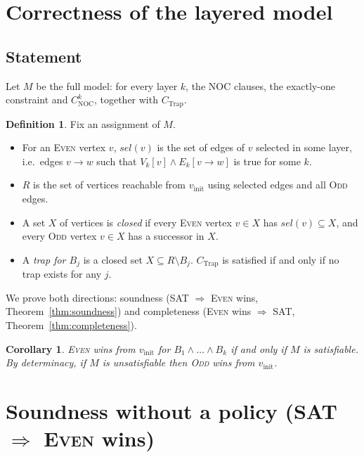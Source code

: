 \documentclass{article}
\newtheorem{corollary}{Corollary}
\theoremstyle{definition}
\newtheorem{definition}{Definition}
\theoremstyle{remark}
\newcommand{\Even}{\textsc{Even}}
\newcommand{\Odd}{\textsc{Odd}}
\newcommand{\vinit}{v_{\mathrm{init}}}
\newcommand{\sel}{\mathit{sel}}
\newcommand{\CNOC}{C_{\mathrm{NOC}}}
\newcommand{\CTrap}{C_{\mathrm{Trap}}}
\begin{document}
\section*{Correctness of the layered model}

\subsection*{Statement}

Let $M$ be the full model: for every layer $k$, the NOC clauses, the
exactly-one constraint and $\CNOC^{k}$, together with $\CTrap$.

\begin{definition}
Fix an assignment of $M$.
\begin{itemize}
  \item For an \Even{} vertex $v$, $\sel(v)$ is the set of edges of $v$
    selected in some layer, i.e.\ edges $v \to w$ such that
    $V_k[v] \wedge E_k[v \to w]$ is true for some $k$.
  \item $R$ is the set of vertices reachable from $\vinit$ using selected
    edges and all \Odd{} edges.
  \item A set $X$ of vertices is \emph{closed} if every \Even{} vertex
    $v \in X$ has $\sel(v) \subseteq X$, and every \Odd{} vertex $v \in X$ has
    a successor in $X$.
  \item A \emph{trap for $B_j$} is a closed set $X \subseteq R \setminus B_j$.
    $\CTrap$ is satisfied if and only if no trap exists for any $j$.
\end{itemize}
\end{definition}

We prove both directions: soundness (SAT $\Rightarrow$ \Even{} wins,
Theorem~\ref{thm:soundness}) and completeness (\Even{} wins $\Rightarrow$ SAT,
Theorem~\ref{thm:completeness}).

\begin{corollary}\label{cor:equiv}
\Even{} wins from $\vinit$ for $B_1 \wedge \dots \wedge B_k$ if and only if
$M$ is satisfiable. By determinacy, if $M$ is unsatisfiable then \Odd{} wins
from $\vinit$.
\end{corollary}

\section*{Soundness without a policy (SAT $\Rightarrow$ \Even{} wins)}
\end{document}
